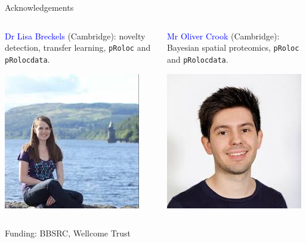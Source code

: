 \documentclass{beamer}
\theoremstyle{example}
\begin{document}
\begin{frame}{Acknowledgements}

  \begin{columns}
    \begin{column}{0.5\textwidth}
      \textcolor{Blue}{Dr Lisa Breckels} (Cambridge): novelty
      detection, transfer learning, \texttt{pRoloc} and
      \texttt{pRolocdata}.\\
      \begin{center}      
        \includegraphics[width=.6\linewidth]{figs/lms.jpg}
      \end{center}
    \end{column}
    
    \begin{column}{0.5\textwidth}
      \textcolor{Blue}{Mr Oliver Crook} (Cambridge): Bayesian spatial
      proteomics, \texttt{pRoloc} and \texttt{pRolocdata}.\\
      \begin{center}        
        \includegraphics[width=.6\linewidth]{figs/omc.jpg}
      \end{center}
    \end{column}    
  \end{columns}

  \bigskip

  Funding: BBSRC, Wellcome Trust

\end{frame}
\end{document}
